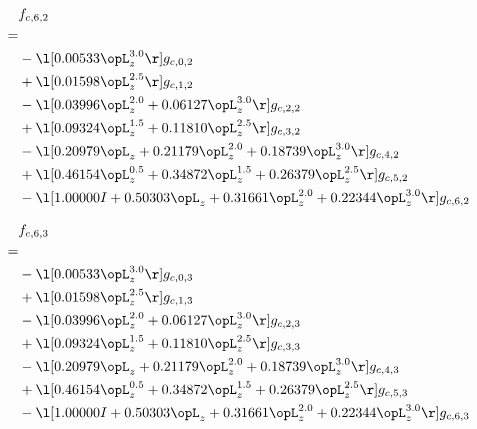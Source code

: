 \begin{alignat}{2} 
\label{eq:f_62_0} 
& f_{c,6,2} \nonumber \\ 
 = \\ 
& - \l[  0.00533 \opL_z^{3.0}  \r] g_{c,0,2} \nonumber \\ 
& + \l[  0.01598 \opL_z^{2.5}  \r] g_{c,1,2} \nonumber \\ 
& - \l[  0.03996 \opL_z^{2.0} +  0.06127 \opL_z^{3.0}  \r] g_{c,2,2} \nonumber \\ 
& + \l[  0.09324 \opL_z^{1.5} +  0.11810 \opL_z^{2.5}  \r] g_{c,3,2} \nonumber \\ 
& - \l[  0.20979 \opL_z +  0.21179 \opL_z^{2.0} +  0.18739 \opL_z^{3.0}  \r] g_{c,4,2} \nonumber \\ 
& + \l[  0.46154 \opL_z^{0.5} +  0.34872 \opL_z^{1.5} +  0.26379 \opL_z^{2.5}  \r] g_{c,5,2} \nonumber \\ 
& - \l[  1.00000 I +  0.50303 \opL_z +  0.31661 \opL_z^{2.0} +  0.22344 \opL_z^{3.0}  \r] g_{c,6,2} \nonumber \\ 
\end{alignat} 


\begin{alignat}{2} 
\label{eq:f_63_0} 
& f_{c,6,3} \nonumber \\ 
 = \\ 
& - \l[  0.00533 \opL_z^{3.0}  \r] g_{c,0,3} \nonumber \\ 
& + \l[  0.01598 \opL_z^{2.5}  \r] g_{c,1,3} \nonumber \\ 
& - \l[  0.03996 \opL_z^{2.0} +  0.06127 \opL_z^{3.0}  \r] g_{c,2,3} \nonumber \\ 
& + \l[  0.09324 \opL_z^{1.5} +  0.11810 \opL_z^{2.5}  \r] g_{c,3,3} \nonumber \\ 
& - \l[  0.20979 \opL_z +  0.21179 \opL_z^{2.0} +  0.18739 \opL_z^{3.0}  \r] g_{c,4,3} \nonumber \\ 
& + \l[  0.46154 \opL_z^{0.5} +  0.34872 \opL_z^{1.5} +  0.26379 \opL_z^{2.5}  \r] g_{c,5,3} \nonumber \\ 
& - \l[  1.00000 I +  0.50303 \opL_z +  0.31661 \opL_z^{2.0} +  0.22344 \opL_z^{3.0}  \r] g_{c,6,3} \nonumber \\ 
\end{alignat} 


